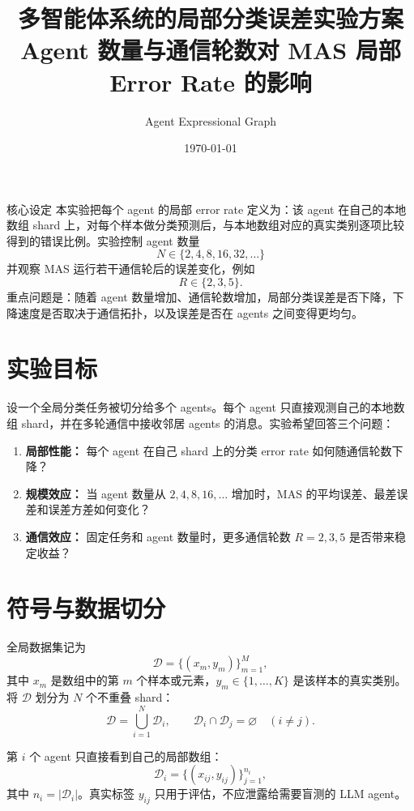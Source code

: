 \documentclass[UTF8,11pt,a4paper,fontset=fandol]{ctexart}
\title{\vspace{-1.8em}\textbf{\Huge 多智能体系统的局部分类误差实验方案}\\[0.35em]
\Large Agent 数量与通信轮数对 MAS 局部 Error Rate 的影响}
\author{Agent Expressional Graph}
\date{\today}
\begin{document}
\maketitle

\begin{summarybox}{核心设定}
本实验把每个 agent 的局部 error rate 定义为：该 agent 在自己的本地数组 shard 上，对每个样本做分类预测后，与本地数组对应的真实类别逐项比较得到的错误比例。实验控制 agent 数量
\[
N \in \{2,4,8,16,32,\ldots\}
\]
并观察 MAS 运行若干通信轮后的误差变化，例如
\[
R \in \{2,3,5\}.
\]
重点问题是：随着 agent 数量增加、通信轮数增加，局部分类误差是否下降，下降速度是否取决于通信拓扑，以及误差是否在 agents 之间变得更均匀。
\end{summarybox}

\section{实验目标}

设一个全局分类任务被切分给多个 agents。每个 agent 只直接观测自己的本地数组 shard，并在多轮通信中接收邻居 agents 的消息。实验希望回答三个问题：

\begin{enumerate}
  \item \textbf{局部性能：} 每个 agent 在自己 shard 上的分类 error rate 如何随通信轮数下降？
  \item \textbf{规模效应：} 当 agent 数量从 \(2,4,8,16,\ldots\) 增加时，MAS 的平均误差、最差误差和误差方差如何变化？
  \item \textbf{通信效应：} 固定任务和 agent 数量时，更多通信轮数 \(R=2,3,5\) 是否带来稳定收益？
\end{enumerate}

\section{符号与数据切分}

全局数据集记为
\[
\mathcal{D}=\{(x_m,y_m)\}_{m=1}^{M},
\]
其中 \(x_m\) 是数组中的第 \(m\) 个样本或元素，\(y_m \in \{1,\ldots,K\}\) 是该样本的真实类别。将 \(\mathcal{D}\) 划分为 \(N\) 个不重叠 shard：
\[
\mathcal{D}=\bigcup_{i=1}^{N}\mathcal{D}_i,\qquad
\mathcal{D}_i\cap\mathcal{D}_j=\varnothing \quad (i\neq j).
\]

第 \(i\) 个 agent 只直接看到自己的局部数组：
\[
\mathcal{D}_i=\{(x_{ij},y_{ij})\}_{j=1}^{n_i},
\]
其中 \(n_i=|\mathcal{D}_i|\)。真实标签 \(y_{ij}\) 只用于评估，不应泄露给需要盲测的 LLM agent。
\end{document}

